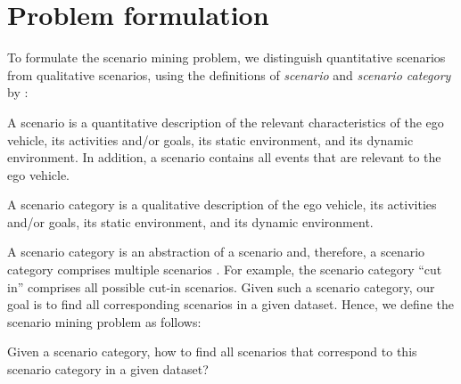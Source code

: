 \section{Problem formulation}
\label{sec:problem}

To formulate the scenario mining problem, we distinguish quantitative scenarios from qualitative scenarios, using the definitions of \emph{scenario} and \emph{scenario category} by \textcite{degelder2018ontology}:

\begin{definition}
	\label{def:scenario}
	A scenario is a quantitative description of the relevant characteristics of the ego vehicle, its activities and/or goals, its static environment, and its dynamic environment. In addition, a scenario contains all events that are relevant to the ego vehicle.
\end{definition}

\begin{definition}
	\label{def:scenario category}
	A scenario category is a qualitative description of the ego vehicle, its activities and/or goals, its static environment, and its dynamic environment.
\end{definition}

\cstarta
A scenario category is an abstraction of a scenario and, therefore, a scenario category comprises multiple scenarios \autocite{degelder2018ontology}.
For example, the scenario category ``cut in'' comprises all possible cut-in scenarios. 
Given such a scenario category, our goal is to find all corresponding scenarios in a given dataset. 
Hence, we define the scenario mining problem as follows:
\begin{problem}
	Given a scenario category, how to find all scenarios that correspond to this scenario category in a given dataset?
\end{problem}
\cenda

